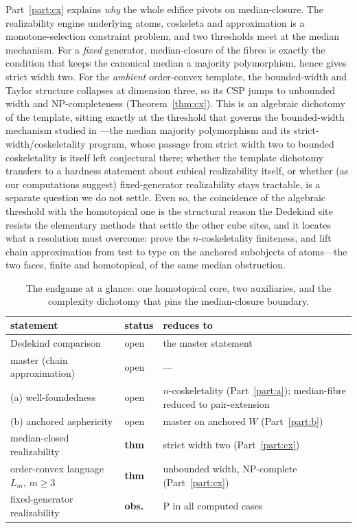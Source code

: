 Part~\ref{part:cx} explains \emph{why} the whole edifice pivots on
median-closure.  The realizability engine underlying atoms, coskeleta and
approximation is a monotone-selection constraint problem, and two
thresholds meet at the median mechanism.  For a \emph{fixed} generator,
median-closure of the fibres is exactly the condition that keeps the
canonical median a majority polymorphism, hence gives strict width two.
For the \emph{ambient} order-convex template, the bounded-width and Taylor
structure collapses at dimension three, so its $\mathrm{CSP}$ jumps to
unbounded width and $\mathrm{NP}$-completeness (Theorem~\ref{thm:cx}).  This is an algebraic dichotomy of the template,
sitting exactly at the threshold that governs the bounded-width mechanism
studied in \cite{PaperW}---the median majority polymorphism and its
strict-width/coskeletality program, whose passage from strict width two to
bounded coskeletality is itself left conjectural there; whether the
template dichotomy
transfers to a hardness statement about cubical realizability itself, or
whether (as our computations suggest) fixed-generator realizability stays
tractable, is a separate question we do not settle.  Even so, the
coincidence of the algebraic threshold with the homotopical one is the
structural reason the Dedekind site resists the elementary methods that
settle the other cube sites, and it locates what a resolution must
overcome: prove the $n$-coskeletality finiteness, and lift chain
approximation from test to type on the anchored subobjects of atoms---the
two faces, finite and homotopical, of the same median obstruction.

\begin{table}[ht]
\centering
\small
\renewcommand{\arraystretch}{1.2}
\begin{tabular}{l l p{}}
\hline
statement & status & reduces to\\
\hline
Dedekind comparison & open & the master statement \cite{PaperW}\\
master (chain approximation) & open & ---\\
(a) well-foundedness & open & $n$-coskeletality (Part~\ref{part:a}); median-fibre reduced to pair-extension\\
(b) anchored asphericity & open & master on anchored $W$ (Part~\ref{part:b})\\
median-closed realizability & \textbf{thm} & strict width two (Part~\ref{part:cx})\\
order-convex language $L_m$, $m\ge3$ & \textbf{thm} & unbounded width, $\mathrm{NP}$-complete (Part~\ref{part:cx})\\
fixed-generator realizability & \textbf{obs.} & $\mathrm P$ in all computed cases\\
\hline
\end{tabular}
\caption{The endgame at a glance: one homotopical core, two auxiliaries,
and the complexity dichotomy that pins the median-closure boundary.}
\end{table}
